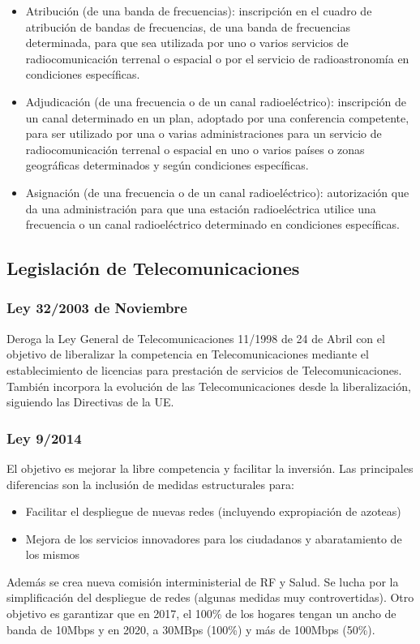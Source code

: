 \begin{itemize}
\begin{itemize}
		\item Atribución (de una banda de frecuencias): inscripción en el cuadro de atribución de bandas de frecuencias, de una banda de frecuencias determinada, para que sea utilizada por uno o varios servicios de radiocomunicación terrenal o espacial o por el servicio de radioastronomía en condiciones específicas. 
		\item Adjudicación (de una frecuencia o de un canal radioeléctrico): inscripción de un canal determinado en un plan, adoptado por una conferencia competente, para ser utilizado por una o varias administraciones para un servicio de radiocomunicación terrenal o espacial en uno o varios países o zonas geográficas determinados y según condiciones específicas.
		\item Asignación (de una frecuencia o de un canal radioeléctrico): autorización que da una administración para que una estación radioeléctrica utilice una frecuencia o un canal radioeléctrico determinado en condiciones específicas. 
	\end{itemize}
\end{itemize}
\subsection{Legislación de Telecomunicaciones}
\subsubsection{Ley 32/2003 de Noviembre}
Deroga la Ley General de Telecomunicaciones 11/1998 de 24 de Abril con el objetivo de liberalizar la competencia en Telecomunicaciones mediante el establecimiento de licencias para prestación de servicios de Telecomunicaciones. También incorpora la evolución de las Telecomunicaciones desde la liberalización, siguiendo las Directivas de la UE.
\subsubsection{Ley 9/2014}
El objetivo es mejorar la libre competencia y facilitar la inversión. Las principales diferencias son la inclusión de medidas estructurales para:
\begin{itemize}
	\item Facilitar el despliegue de nuevas redes (incluyendo expropiación de azoteas)
	\item Mejora de los servicios innovadores para los ciudadanos y abaratamiento de los mismos
\end{itemize}
Además se crea nueva comisión interministerial de \acrshort{RF} y Salud. Se lucha por la simplificación del despliegue de redes (algunas medidas muy controvertidas). Otro objetivo es garantizar que en 2017, el 100\% de los hogares tengan un ancho de banda de 10Mbps y en 2020, a 30MBps (100\%) y más de 100Mbps (50\%).